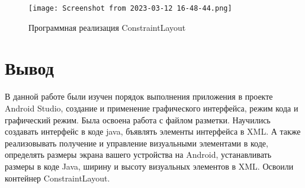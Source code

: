 \begin{figure}[h!tp]
	\centering
	\texttt{[image: Screenshot from 2023-03-12 16-48-44.png]}
	\caption{Программная реализация ConstraintLayout}
	\label{fig:java:constrainly}
\end{figure}

\clearpage

\section*{\LARGE{Вывод}}
В данной работе были изучен порядок выполнения приложения
в проекте Android Studio, создание и применение графического интерфейса,
режим кода и графический режим. Была освоена работа с файлом разметки.
Научились создавать интерфейс в коде java, бъявлять элементы интерфейса в XML.
А также реализовывать получение и управление визуальными элементами в коде,
определять размеры экрана вашего устройства на Android,
устанавливать размеры в коде Java, ширину и высоту визуальных элементов в XML.
Освоили контейнер ConstraintLayout.

